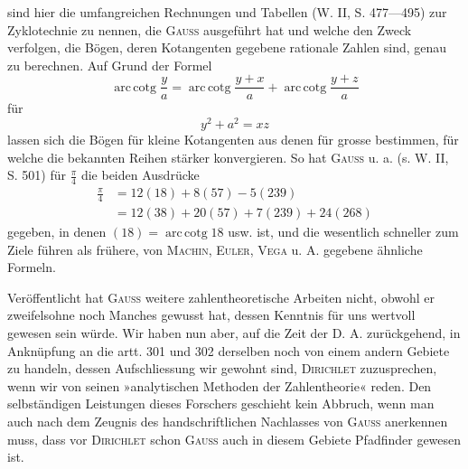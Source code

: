 \noindent sind hier die umfangreichen Rechnungen und Tabellen (W. II, S. 477—495) zur Zyklotechnie zu nennen, die \textsc{Gauss} ausgeführt hat und welche den Zweck verfolgen, die Bögen, deren Kotangenten gegebene rationale Zahlen sind, genau zu berechnen. Auf Grund der Formel
\[
\operatorname{arc\,cotg}\frac{y}{a}=\operatorname{arc\,cotg}\frac{y+x}{a}+\operatorname{arc\,cotg}\frac{y+z}{a}
\]
für
\[
y^2+a^2=xz
\]
lassen sich die Bögen für kleine Kotangenten aus denen für grosse bestimmen, für welche die bekannten Reihen stärker konvergieren. So hat \textsc{Gauss} u. a. (s. W. II, S. 501) für \(\frac\pi4\) die beiden Ausdrücke
\[
\begin{aligned}
\frac\pi4&=12(18)+8(57)-5(239)\\
&=12(38)+20(57)+7(239)+24(268)
\end{aligned}
\]
gegeben, in denen \((18)=\operatorname{arc\,cotg}18\) usw. ist, und die wesentlich schneller zum Ziele führen als frühere, von \textsc{Machin}, \textsc{Euler}, \textsc{Vega} u. A. gegebene ähnliche Formeln.

Veröffentlicht hat \textsc{Gauss} weitere zahlentheoretische Arbeiten nicht, obwohl er zweifelsohne noch Manches gewusst hat, dessen Kenntnis für uns wertvoll gewesen sein würde. Wir haben nun aber, auf die Zeit der D. A. zurückgehend, in Anknüpfung an die artt. 301 und 302 derselben noch von einem andern Gebiete zu handeln, dessen Aufschliessung wir gewohnt sind, \textsc{Dirichlet}
\newpage{}
\noindent zuzusprechen, wenn wir von seinen »analytischen Methoden der Zahlentheorie« reden. Den selbständigen Leistungen dieses Forschers geschieht kein Abbruch, wenn man auch nach dem Zeugnis des handschriftlichen Nachlasses von \textsc{Gauss} anerkennen muss, dass vor \textsc{Dirichlet} schon \textsc{Gauss} auch in diesem Gebiete Pfadfinder gewesen ist.

